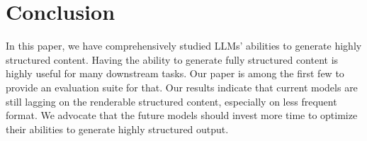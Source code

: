 \section{Conclusion}
\label{sec:conclusion}
In this paper, we have comprehensively studied LLMs' abilities to generate highly structured content. Having the ability to generate fully structured content is highly useful for many downstream tasks. Our paper is among the first few to provide an evaluation suite for that. Our results indicate that current models are still lagging on the renderable structured content, especially on less frequent format. We advocate that the future models should invest more time to optimize their abilities to generate highly structured output.